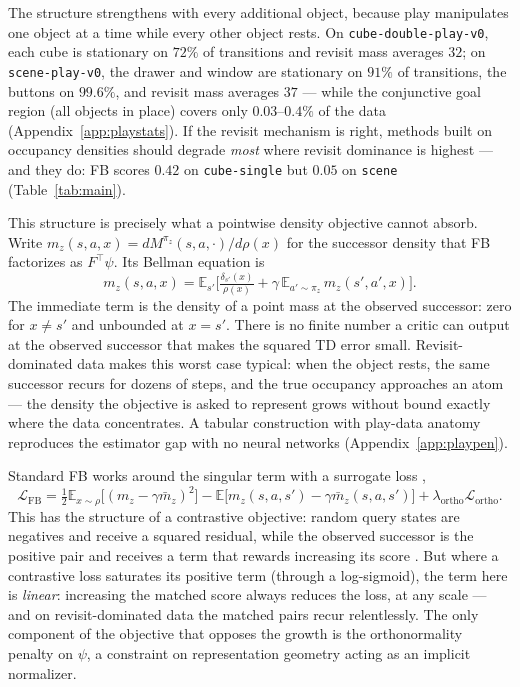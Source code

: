 \documentclass{article}
\newcommand{\E}{\mathbb{E}}
\begin{document}
The structure strengthens with every additional object, because play
manipulates one object at a time while every other object rests. On
\texttt{cube-double-play-v0}, each cube is stationary on $72\%$ of transitions
and revisit mass averages $32$; on \texttt{scene-play-v0}, the drawer and
window are stationary on $91\%$ of transitions, the buttons on $99.6\%$, and
revisit mass averages $37$ --- while the conjunctive goal region (all objects
in place) covers only $0.03$--$0.4\%$ of the data
(Appendix~\ref{app:playstats}). If the revisit mechanism is right, methods
built on occupancy densities should degrade \emph{most} where revisit
dominance is highest --- and they do: FB scores $0.42$ on \texttt{cube-single}
but $0.05$ on \texttt{scene} (Table~\ref{tab:main}).

This structure is precisely what a pointwise density objective cannot absorb.
Write $m_z(s,a,x)=dM^{\pi_z}(s,a,\cdot)/d\rho(x)$ for the successor density
that FB factorizes as $F^{\top}\psi$. Its Bellman equation is
\begin{equation}
\label{eq:density-bellman}
m_z(s,a,x)
=
\E_{s'}\Big[
\tfrac{\delta_{s'}(x)}{\rho(x)}
+\gamma\,\E_{a'\sim\pi_z}\,m_z(s',a',x)
\Big].
\end{equation}
The immediate term is the density of a point mass at the observed successor:
zero for $x\ne s'$ and unbounded at $x=s'$. There is no finite number a critic
can output at the observed successor that makes the squared TD error small.
Revisit-dominated data makes this worst case typical: when the object rests,
the same successor recurs for dozens of steps, and the true occupancy
approaches an atom --- the density the objective is asked to represent grows
without bound exactly where the data concentrates. A tabular construction with
play-data anatomy reproduces the estimator gap with no neural networks
(Appendix~\ref{app:playpen}).

Standard FB works around the singular term with a surrogate loss
\citep{touati2021learning},
\begin{equation}
\label{eq:fb-loss}
\mathcal{L}_{\mathrm{FB}}
=
\tfrac{1}{2}\E_{x\sim\rho}\big[(m_z-\gamma\bar m_z)^2\big]
-\E\big[m_z(s,a,s')-\gamma\bar m_z(s,a,s')\big]
+\lambda_{\mathrm{ortho}}\mathcal{L}_{\mathrm{ortho}}.
\end{equation}
This has the structure of a contrastive objective: random query states are
negatives and receive a squared residual, while the observed successor is the
positive pair and receives a term that rewards increasing its score
\citep{eysenbach2022contrastive}. But where a contrastive loss saturates its
positive term (through a log-sigmoid), the term here is \emph{linear}:
increasing the matched score always reduces the loss, at any scale --- and on
revisit-dominated data the matched pairs recur relentlessly. The only component
of the objective that opposes the growth is the orthonormality penalty on
$\psi$, a constraint on representation geometry acting as an implicit
normalizer.
\end{document}
